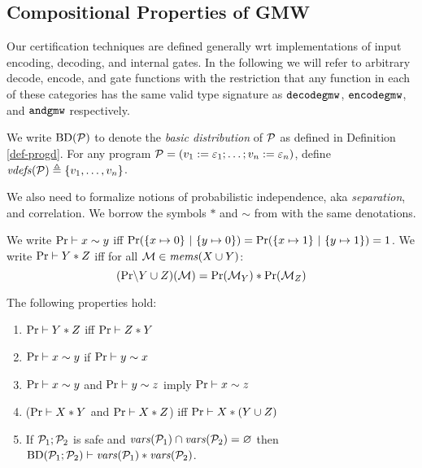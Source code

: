 \subsection{Compositional Properties of GMW}



Our certification techniques are defined generally wrt implementations
of input encoding, decoding, and internal gates. In the following we
will refer to arbitrary decode, encode, and gate functions with the
restriction that any function in each of these categories has the same
valid type signature as $\texttt{decodegmw}$, $\texttt{encodegmw}$, and
$\texttt{andgmw}$ respectively.
\begin{definition}
  We write $\mathrm{BD}(\mathcal{P})$ to denote the \emph{basic distribution} of
  $\mathcal{P}$ as defined in Definition \ref{def-progd}. For any program $\mathcal{P} =
  (v_1 := \varepsilon_1;\ldots;v_n := \varepsilon_n)$, define
  $\mathit{vdefs}(\mathcal{P}) \triangleq \{ v_1,\ldots,v_n \}$.
\end{definition}
We also need to formalize notions of probabilistic independence, aka
\emph{separation}, and correlation. We borrow the symbols $*$ and $\sim$
from \cite{barthe2019probabilistic} with the same denotations.
\begin{definition}
  We write $\mathrm{Pr} \vdash x \sim y$ iff $\mathrm{Pr}(\{ x \mapsto 0\}\ |\ \{ y \mapsto 0 \}) =
  \mathrm{Pr}(\{ x \mapsto 1\}\ |\ \{ y \mapsto 1 \}) = 1$.
  We write $\mathrm{Pr} \vdash Y * Z$ iff for all
    $\mathcal{M} \in \mathit{mems}(X \cup Y)$:
  $$(\mathrm{Pr}\backslash Y \cup Z)(\mathcal{M}) =
  \mathrm{Pr}(\mathcal{M}_Y) * \mathrm{Pr}(\mathcal{M}_Z)$$ 
\end{definition}

\begin{lemma}
  \label{lemma-separation}
  The following properties hold:
  \begin{enumerate}
  \item $\mathrm{Pr} \vdash Y * Z$ iff $\mathrm{Pr} \vdash Z * Y$
  \item $\mathrm{Pr} \vdash x \sim y$ if  $\mathrm{Pr} \vdash y \sim x$
  \item $\mathrm{Pr} \vdash x \sim y$ and $\mathrm{Pr} \vdash y \sim z$ imply $\mathrm{Pr} \vdash x \sim z$
  \item ($\mathrm{Pr} \vdash X * Y$ and $\mathrm{Pr} \vdash X * Z$) iff $\mathrm{Pr} \vdash X * (Y \cup Z)$
  \item If $\mathcal{P}_1;\mathcal{P}_2$ is safe and $\mathit{vars}(\mathcal{P}_1) \cap \mathit{vars}(\mathcal{P}_2) = \varnothing$
    then $\mathrm{BD}(\mathcal{P}_1;\mathcal{P}_2) \vdash \mathit{vars}(\mathcal{P}_1) * \mathit{vars}(\mathcal{P}_2)$.
  \end{enumerate}
\end{lemma}

